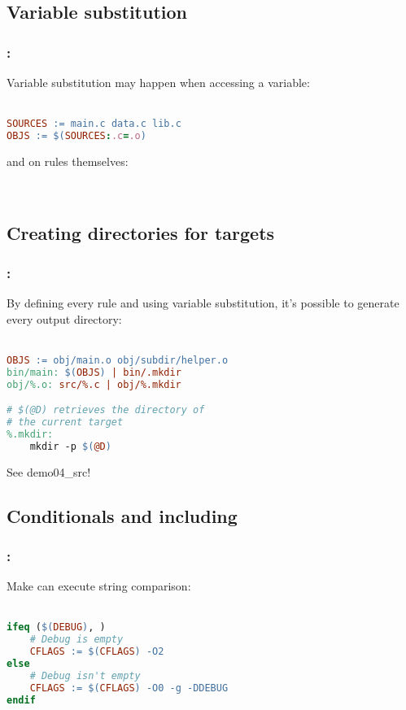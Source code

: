 \subsection{Variable substitution}
\begin{frame}[fragile]
    \frametitle{\secname: \small\subsecname\normalsize}

    Variable substitution may happen when accessing a variable: \\~\\
    \begin{lstlisting}[language=make]
SOURCES := main.c data.c lib.c
OBJS := $(SOURCES:.c=.o)
    \end{lstlisting}

    and on rules themselves: \\~\\
    \begin{lstlisting}[language=make]
%.o: %.c
    \end{lstlisting}

\end{frame}

\subsection{Creating directories for targets}
\begin{frame}[fragile]
    \frametitle{\secname: \small\subsecname\normalsize}

    By defining every rule and using variable substitution, it's possible
    to generate every output directory: \\~\\

    \begin{lstlisting}[language=make]
OBJS := obj/main.o obj/subdir/helper.o
bin/main: $(OBJS) | bin/.mkdir
obj/%.o: src/%.c | obj/%.mkdir

# $(@D) retrieves the directory of
# the current target
%.mkdir:
    mkdir -p $(@D)
    \end{lstlisting}

    See demo04\_src!
\end{frame}

\subsection{Conditionals and including}
\begin{frame}[fragile]
    \frametitle{\secname: \small\subsecname\normalsize}

    Make can execute string comparison: \\~\\

    \begin{lstlisting}[language=make]
ifeq ($(DEBUG), )
    # Debug is empty
    CFLAGS := $(CFLAGS) -O2
else
    # Debug isn't empty
    CFLAGS := $(CFLAGS) -O0 -g -DDEBUG
endif
    \end{lstlisting}
\end{frame}

